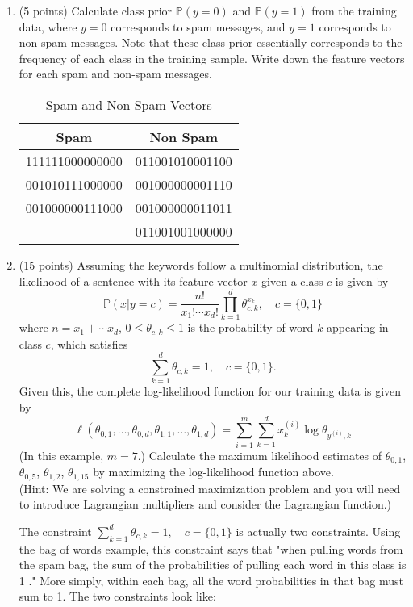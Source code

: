 \documentclass[12pt]{article}
\begin{document}
\begin{enumerate}
\item (5 points) Calculate class prior $\mathbb P(y = 0)$ and $\mathbb P(y = 1)$ from the training data, where $y = 0$ corresponds to spam messages, and $y = 1$ corresponds to non-spam messages. Note that these class prior essentially corresponds to the frequency of each class in the training sample. Write down the feature vectors for each spam and non-spam messages.

\begin{table}[H]
    \centering
    \begin{tabular}{|c|c|}
        \hline
        \textbf{Spam} & \textbf{Non Spam} \\
        \hline
        \textsf{111111000000000} & \textsf{011001010001100} \\
        \hline
        \textsf{001010111000000} & \textsf{001000000001110} \\
        \hline
        \textsf{001000000111000} & \textsf{001000000011011} \\
        \hline
        & \textsf{011001001000000} \\
        \hline
    \end{tabular}
    \caption{Spam and Non-Spam Vectors}
    \label{tab:sentiment_messages}
\end{table}

\item (15 points)  Assuming the keywords follow a multinomial distribution, the likelihood of a sentence with its feature vector $x$ given a class $c$ is given by 
\[
 \mathbb P (x|y = c) = \frac{n!}{x_1! \cdots x_d!}\prod_{k=1}^d \theta_{c, k}^{x_k}, \quad c = \{0, 1\}
\]
where $n = x_1 + \cdots x_d$, $0 \leq \theta_{c,k} \leq 1$ is the probability of word $k$ appearing in class $c$, which satisfies 
\[\sum_{k=1}^d \theta_{c,k} = 1, \quad c = \{0, 1\}.\] Given this, the complete log-likelihood function for our training data is given by
\[
\ell(\theta_{0,1}, \ldots, \theta_{0, d}, \theta_{1,1}, \ldots, \theta_{1, d}) = 
\sum_{i=1}^m \sum_{k=1}^d x_k^{(i)} \log \theta_{y^{(i)}, k}
\]
(In this example, $m = 7$.)
 Calculate the maximum likelihood estimates of $\theta_{0,1}$, $\theta_{0,5}$, $\theta_{1,2}$, $\theta_{1,15}$ by maximizing the log-likelihood function above.\\
 (Hint: We are solving a constrained maximization problem and you will need to introduce Lagrangian multipliers and consider the Lagrangian function.)

The constraint $\sum_{k=1}^d \theta_{c,k} = 1, \quad c = \{0, 1\}$ is actually two constraints. Using the bag of words example, this constraint says that "when pulling words from the spam bag, the sum of the probabilities of pulling each word in this class is 1 \supercite{ED_Brent_Speelman}." More simply, within each bag, all the word probabilities in that bag must sum to 1. The two constraints look like:


\end{enumerate}
\end{document}

